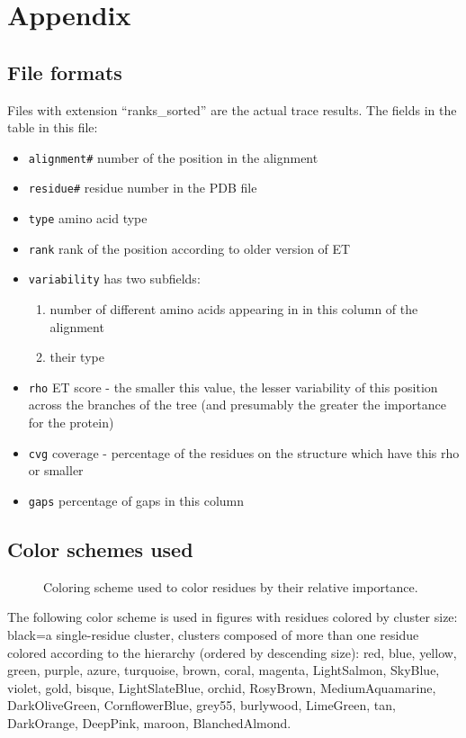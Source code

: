 \section{Appendix}
\subsection{File formats}
Files with extension ``ranks\_sorted''  are the actual trace results.
The fields in the table in this file:
\begin{itemize}
\item {\tt alignment\#}     number of the position in the alignment
\item {\tt residue\#}        residue number in the PDB file
\item {\tt type}            amino acid type
\item {\tt rank}            rank of the position according to older version of ET
\item {\tt variability}     has two subfields:
  \begin{enumerate}
                \item number of different amino acids appearing in
                    in this column  of the alignment
                \item  their type
  \end{enumerate}
		  
\item {\tt rho}             ET score - the smaller this value, the lesser variability
                of this position across the branches of the tree
                (and presumably the greater the importance for the protein)
\item {\tt cvg}             coverage - percentage of the residues on the structure which
                have this rho or smaller
\item {\tt gaps}            percentage of gaps in this column
\end{itemize}

\subsection{Color schemes used}
\begin{figure} [t]
{
}
\caption{\label{colorbar} Coloring scheme used to color residues by their relative importance.}
\end{figure}
The following color scheme is used in figures with residues colored by  cluster size:
 black=a single-residue cluster, clusters composed of more than one residue colored according to the hierarchy 
(ordered by descending size): red, blue, yellow, green, purple, azure, turquoise, brown, coral,
               magenta, LightSalmon, SkyBlue, violet, gold, bisque, LightSlateBlue, orchid,
               RosyBrown, MediumAquamarine, DarkOliveGreen, CornflowerBlue, grey55, burlywood,
               LimeGreen, tan, DarkOrange, DeepPink, maroon, BlanchedAlmond.

